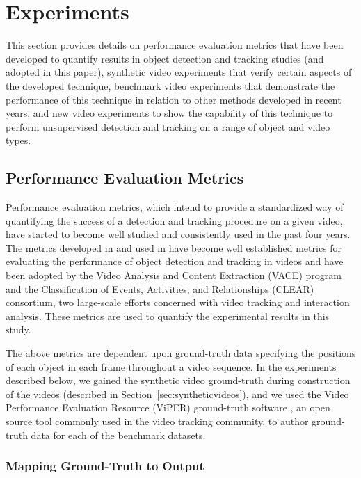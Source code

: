 \documentclass[smallcondensed, final]{svjour3}
\begin{document}
\section{Experiments}
\label{sec:experiments}

This section provides details on performance evaluation metrics that have been developed to quantify results in object detection and tracking studies (and adopted in this paper), synthetic video experiments that verify certain aspects of the developed technique, benchmark video experiments that demonstrate the performance of this technique in relation to other methods developed in recent years, and new video experiments to show the capability of this technique to perform unsupervised detection and tracking on a range of object and video types.   


\subsection{Performance Evaluation Metrics}
\label{sec:performance_metrics}

Performance evaluation metrics, which intend to provide a standardized way of quantifying the success of a detection and tracking procedure on a given video, have started to become well studied and consistently used in the past four years. The metrics developed in \cite{kasturi_2008} and used in \cite{ellis_2010, taj_2007, lee_2009} have become well established metrics for evaluating the performance of object detection and tracking in videos and have been adopted by the Video Analysis and Content Extraction (VACE) program and the Classification of Events, Activities, and Relationships (CLEAR) consortium, two large-scale efforts concerned with video tracking and interaction analysis. These metrics are used to quantify the experimental results in this study.

The above metrics are dependent upon ground-truth data specifying the positions of each object in each frame throughout a video sequence. In the experiments described below, we gained the synthetic video ground-truth during construction of the videos (described in Section~\ref{sec:syntheticvideos}), and we used the Video Performance Evaluation Resource (ViPER) ground-truth software \cite{doermann_2000}, an open source tool commonly used in the video tracking community, to author ground-truth data for each of the benchmark datasets.


\subsubsection{Mapping Ground-Truth to Output}
\label{sec:mappingtoground}
\end{document}
